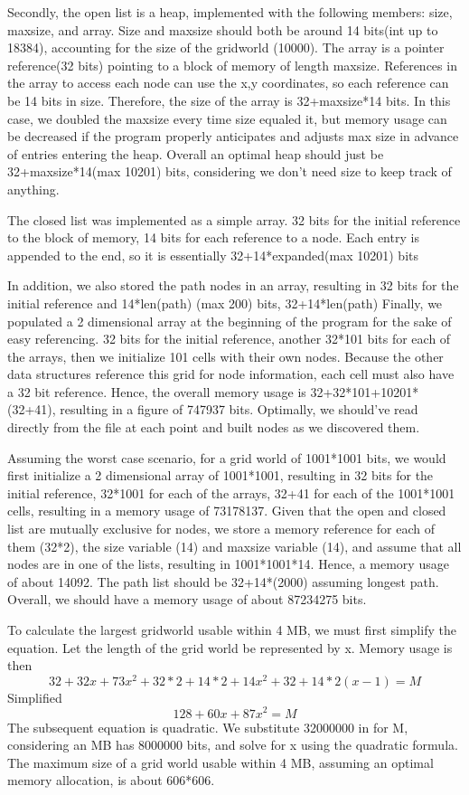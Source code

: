 \documentclass{article}
\begin{document}
Secondly, the open list is a heap, implemented with the following members: size, maxsize, and array. Size and maxsize should both be around 14 bits(int up to 18384), accounting for the size of the gridworld (10000). The array is a pointer reference(32 bits) pointing to a block of memory of length maxsize. References in the array to access each node can use the x,y coordinates, so each reference can be 14 bits in size. Therefore, the size of the array is 32+maxsize*14 bits. In this case, we doubled the maxsize every time size equaled it, but memory usage can be decreased if the program properly anticipates and adjusts max size in advance of entries entering the heap. Overall an optimal heap should just be 32+maxsize*14(max 10201) bits, considering we don't need size to keep track of anything.

The closed list was implemented as a simple array. 32 bits for the initial reference to the block of memory, 14 bits for each reference to a node. Each entry is appended to the end, so it is essentially 32+14*expanded(max 10201) bits

In addition, we also stored the path nodes in an array, resulting in 32 bits for the initial reference and 14*len(path) (max 200) bits, 32+14*len(path)
Finally, we populated a 2 dimensional array at the beginning of the program for the sake of easy referencing. 32 bits for the initial reference, another 32*101 bits for each of the arrays, then we initialize 101 cells with their own nodes. Because the other data structures reference this grid for node information, each cell must also have a 32 bit reference. Hence, the overall memory usage is 32+32*101+10201*(32+41), resulting in a figure of 747937 bits. Optimally, we should've read directly from the file at each point and built nodes as we discovered them.

Assuming the worst case scenario, for a grid world of 1001*1001 bits, we would first initialize a 2 dimensional array of 1001*1001, resulting in 32 bits for the initial reference, 32*1001 for each of the arrays, 32+41 for each of the 1001*1001 cells, resulting in a memory usage of 73178137. Given that the open and closed list are mutually exclusive for nodes, we store a memory reference for each of them (32*2), the size variable (14) and maxsize variable (14), and assume that all nodes are in one of the lists, resulting in 1001*1001*14. Hence, a memory usage of about 14092. The path list should be 32+14*(2000) assuming longest path. Overall, we should have a memory usage of about 87234275 bits.

To calculate the largest gridworld usable within 4 MB, we must first simplify the equation. Let the length of the grid world be represented by x. Memory usage is then
\begin{equation}
32+32x+73x^2+32*2+14*2+14x^2+32+14*2(x-1) = M
\end{equation}
Simplified
\begin{equation}
	128+60x+87x^2 = M
\end{equation}
The subsequent equation is quadratic. We substitute 32000000 in for M, considering an MB has 8000000 bits, and solve for x using the quadratic formula. The maximum size of a grid world usable within 4 MB, assuming an optimal memory allocation, is about 606*606.
\end{document}
